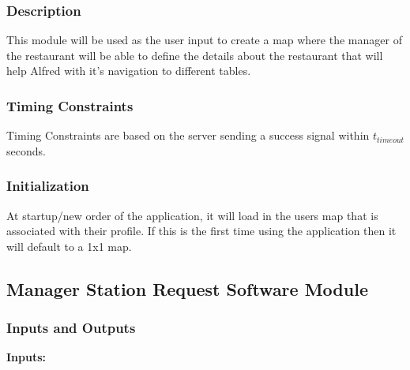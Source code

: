 \documentclass [10pt]{article}
\begin{document}

\subsubsection{Description}
This module will be used as the user input to create a map where the manager of the restaurant will be able to define the details about the restaurant that will help Alfred with it's navigation to different tables.


\subsubsection{Timing Constraints}
Timing Constraints are based on the server sending a success signal within  $ t_{timeout} $ seconds.


\subsubsection{Initialization}
At startup/new order of the application, it will load in the users map that is associated with their profile. If this is the first time using the application then it will default to a 1x1 map.


\subsection{Manager Station Request Software Module}


\subsubsection{Inputs and Outputs}

\textbf{Inputs: } \\
\end{document}
